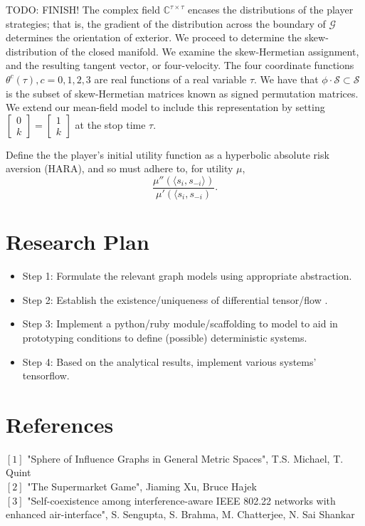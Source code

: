 \documentclass[10pt]{article}
\newcommand{\mcG}{\mathcal{G}}
\newcommand{\mcS}{\mathcal{S}}
\theoremstyle{definition}
\begin{document}
TODO: FINISH!
The complex field $\mathbb{C}^{\tau\times\tau}$ encases the distributions of the
player strategies; that is, the gradient of the distribution across the boundary
of $\mcG$ determines the orientation of exterior. 
We proceed to determine the skew-distribution of the closed manifold. 
We examine the skew-Hermetian assignment, and the resulting tangent vector, or four-velocity. 
The four coordinate functions $\theta^c (\tau), c = 0, 1, 2, 3$ are real
functions of a real variable $\tau$. 
We have that $\phi\cdot \mcS\subset \mcS$ is the subset of skew-Hermetian matrices known as signed
permutation matrices. We extend our mean-field model to include this
representation by setting $\begin{bmatrix}0 \\ k\end{bmatrix} = \begin{bmatrix}1
\\ k\end{bmatrix}$ at the stop time $\tau$. 

Define the the player's initial utility
function as a hyperbolic absolute risk aversion (HARA), and so must adhere to,
for utility $\mu$,
$$
    \displaystyle\frac{\mu''(\langle s_i,s_{-i}\rangle)}{\mu'(\langle s_i,
    s_{-i})}.
$$

\section{Research Plan}

\begin{itemize}
	\item Step 1: Formulate the relevant graph models using appropriate abstraction.
	\item Step 2: Establish the existence/uniqueness of differential tensor/flow .
	\item Step 3: Implement a python/ruby module/scaffolding to model to aid in prototyping
    conditions to define (possible) deterministic systems. 
	\item Step 4: Based on the analytical results, implement various systems' tensorflow.
\end{itemize}

\section{References}

$[1]$ "Sphere of Influence Graphs in General Metric Spaces", T.S. Michael, T. Quint\\
$[2]$ "The Supermarket Game", Jiaming Xu, Bruce Hajek\\
$[3]$ "Self-coexistence among interference-aware IEEE 802.22 networks with enhanced air-interface", S. Sengupta, S. Brahma, M. Chatterjee, N. Sai Shankar\\
\end{document}
